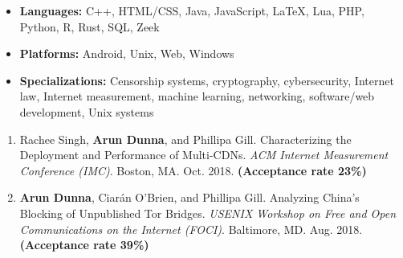
\begin{itemize}
  \item \textbf{Languages:} C++, HTML/CSS, Java, JavaScript, LaTeX, Lua, PHP, Python, R, Rust, SQL, Zeek
  \item \textbf{Platforms:} Android, Unix, Web, Windows
  \item \textbf{Specializations:} Censorship systems, cryptography, cybersecurity, Internet law, Internet measurement, machine learning, networking, software/web development, Unix systems

\end{itemize}


\begin{enumerate}
 \item Rachee Singh, \textbf{Arun Dunna}, and Phillipa Gill. Characterizing the Deployment and Performance of Multi-CDNs. \textit{ACM Internet Measurement Conference (IMC)}. Boston, MA. Oct. 2018. \textbf{(Acceptance rate 23\%)}
 \item \textbf{Arun Dunna}, Ciar\'an O'Brien, and Phillipa Gill. Analyzing China's Blocking of Unpublished Tor Bridges. \textit{USENIX Workshop on Free and Open Communications on the Internet (FOCI)}. Baltimore, MD. Aug. 2018. \textbf{(Acceptance rate 39\%)}
\end{enumerate}

\newpage


\begin{itemize}
  \setlength{\itemsep}{0pt}
\end{itemize}


\begin{itemize}
  \setlength{\itemsep}{0pt}
\end{itemize}


\begin{itemize}
  \setlength{\itemsep}{0pt}
\end{itemize}


